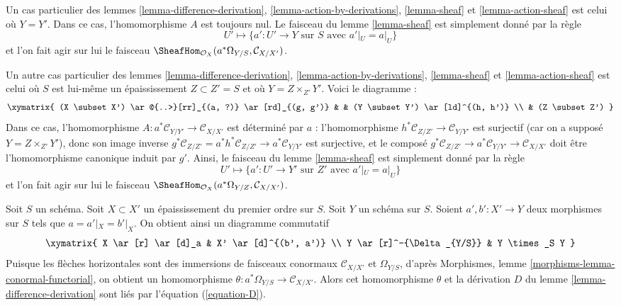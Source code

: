 \begin{remark}
\label{remark-special-case}
Un cas particulier des
lemmes \ref{lemma-difference-derivation},
\ref{lemma-action-by-derivations},
\ref{lemma-sheaf} et
\ref{lemma-action-sheaf}
est celui où $Y = Y'$. Dans ce cas, l'homomorphisme $A$ est toujours nul.
Le faisceau du
lemme \ref{lemma-sheaf}
est simplement donné par la règle
$$
U' \mapsto
\{a' : U' \to Y\text{ sur }S\text{ avec } a'|_U = a|_U\}
$$
et l'on fait agir sur lui le faisceau
$\SheafHom_{\mathcal{O}_X}(a^*\Omega_{Y/S}, \mathcal{C}_{X/X'})$.
\end{remark}

\begin{remark}
\label{remark-another-special-case}
Un autre cas particulier des
lemmes \ref{lemma-difference-derivation},
\ref{lemma-action-by-derivations},
\ref{lemma-sheaf} et
\ref{lemma-action-sheaf}
est celui où $S$ est lui-même un épaississement $Z \subset Z' = S$
et où $Y = Z \times_{Z'} Y'$. Voici le diagramme :
$$
\xymatrix{
(X \subset X') \ar@{..>}[rr]_{(a, ?)} \ar[rd]_{(g, g')} & &
(Y \subset Y') \ar[ld]^{(h, h')} \\
& (Z \subset Z')
}
$$
Dans ce cas, l'homomorphisme $A : a^*\mathcal{C}_{Y/Y'} \to \mathcal{C}_{X/X'}$
est déterminé par $a$ : l'homomorphisme
$h^*\mathcal{C}_{Z/Z'} \to \mathcal{C}_{Y/Y'}$ est surjectif (car
on a supposé $Y = Z \times_{Z'} Y'$),
donc son image inverse $g^*\mathcal{C}_{Z/Z'} = a^*h^*\mathcal{C}_{Z/Z'} \to
a^*\mathcal{C}_{Y/Y'}$ est surjective, et le composé
$g^*\mathcal{C}_{Z/Z'} \to a^*\mathcal{C}_{Y/Y'} \to \mathcal{C}_{X/X'}$
doit être l'homomorphisme canonique induit par $g'$. Ainsi, le faisceau du
lemme \ref{lemma-sheaf}
est simplement donné par la règle
$$
U' \mapsto
\{a' : U' \to Y'\text{ sur }Z'\text{ avec } a'|_U = a|_U\}
$$
et l'on fait agir sur lui le faisceau
$\SheafHom_{\mathcal{O}_X}(a^*\Omega_{Y/Z}, \mathcal{C}_{X/X'})$.
\end{remark}

\begin{lemma}
\label{lemma-omega-deformation}
Soit $S$ un schéma. Soit $X \subset X'$ un épaississement du premier ordre sur
$S$. Soit $Y$ un schéma sur $S$. Soient
$a', b' : X' \to Y$ deux morphismes sur $S$ tels que
$a = a'|_X = b'|_X$. On obtient ainsi un diagramme commutatif
$$
\xymatrix{
X \ar[r] \ar[d]_a & X' \ar[d]^{(b', a')} \\
Y \ar[r]^-{\Delta_{Y/S}} & Y \times_S Y
}
$$
Puisque les flèches horizontales sont des immersions de faisceaux conormaux
$\mathcal{C}_{X/X'}$ et $\Omega_{Y/S}$, d'après
Morphismes, lemme \ref{morphisms-lemma-conormal-functorial},
on obtient un homomorphisme $\theta : a^*\Omega_{Y/S} \to \mathcal{C}_{X/X'}$.
Alors cet homomorphisme $\theta$ et la dérivation $D$ du
lemme \ref{lemma-difference-derivation}
sont liés par l'équation (\ref{equation-D}).
\end{lemma}

